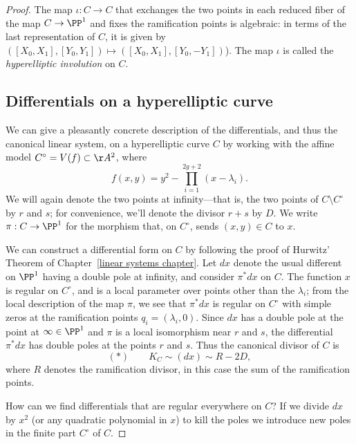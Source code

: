 \begin{proof}
 The map $\iota : C \to C$ that exchanges the two points in each reduced fiber of the map $C \to \PP^1$ and fixes the ramification points is algebraic: in terms of the last representation of $C$, it is given by $([X_0,X_1], [Y_0,Y_1]) \mapsto  ([X_0,X_1], [Y_0,-Y_1]) $). The map $\iota$ is called the \emph{hyperelliptic involution} on $C$.

  \subsection{Differentials on a hyperelliptic curve}\label{hyperelliptic differentials}

We can give a pleasantly concrete description of the differentials, and thus the canonical linear system, on a hyperelliptic curve $C$ by working with the affine model $C^\circ = V(f) \subset \AA^2$, where
$$
f(x,y) = y^2 - \prod_{i=1}^{2g+2} (x - \lambda_i).
$$
We will again denote the two points at infinity---that is, the two points of $C \setminus C^\circ$ by $r$ and $s$; for convenience, we'll denote the divisor $r+s$ by $D$. We write $\pi:C \to \PP^1$ for the morphism that, on $C^\circ$, sends $(x,y) \in C$ to $x$.

We can construct a differential form on $C$ by following the proof of Hurwitz' Theorem of Chapter~\ref{linear systems chapter}.
Let $dx$ denote the usual different on $\PP^1$ having a double pole at infinity, and consider $\pi^*dx$ on $C$.  The function $x$ is regular on $C^\circ$, and is a local parameter over points other than the $\lambda_i$; from the local description of the map $\pi$, we see that $\pi^*dx$ is regular on $C^\circ$  with simple zeros at the ramification points $q_i = (\lambda_i, 0)$. Since $dx$ has a double pole at the point at $\infty\in \PP^1$ and $\pi$ is a local isomorphism near $r$ and $s$, the differential $\pi^*dx$ has double poles at the points $r$ and $s$. Thus the canonical
divisor of $C$ is 
$$
(*) \qquad K_C \sim (dx) \sim R - 2D,
$$
where $R$ denotes the ramification divisor, in this case the sum of the ramification points. 

How can we find differentials that are regular everywhere on $C$? If we divide $dx$ by $x^2$ (or any quadratic polynomial in $x$) to kill the poles we  introduce new poles in the finite part $C^\circ$ of $C$. 


\end{proof}
